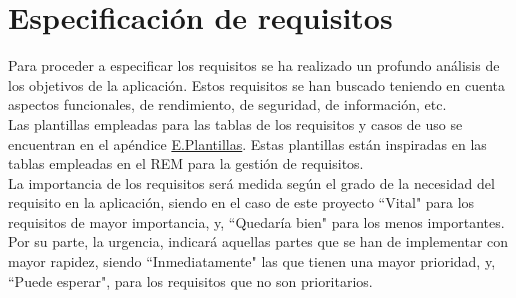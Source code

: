 \chapter{Especificación de requisitos}
\label{enlaceespecificacion}

Para proceder a especificar los requisitos se ha realizado un profundo análisis de los objetivos de la aplicación. Estos requisitos se han buscado teniendo en cuenta aspectos funcionales, de rendimiento, de seguridad, de información, etc.
\\

Las plantillas empleadas para las tablas de los requisitos y casos de uso se encuentran en el apéndice \hyperref[plantillas]{E.Plantillas}. Estas plantillas están inspiradas en las tablas empleadas en el REM \cite{rem} para la gestión de requisitos.
\\

La importancia de los requisitos será medida según el grado de la necesidad del requisito en la aplicación, siendo en el caso de este proyecto ``Vital" para los requisitos de mayor importancia, y, ``Quedaría bien" para los menos importantes. Por su parte, la urgencia, indicará aquellas partes que se han de implementar con mayor rapidez, siendo ``Inmediatamente" las que tienen una mayor prioridad, y, ``Puede esperar", para los requisitos que no son prioritarios.




